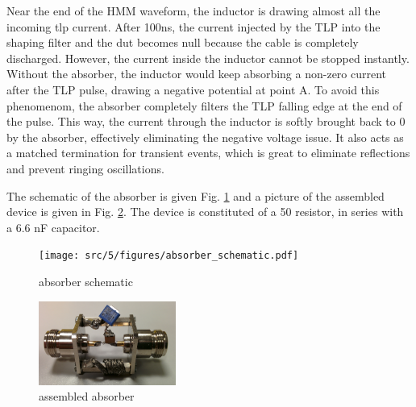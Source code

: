 Near the end of the HMM waveform, the inductor is drawing almost all the incoming \gls{tlp} current.
After 100ns, the current injected by the TLP into the shaping filter and the \gls{dut} becomes null because the cable is completely discharged.
However, the current inside the inductor cannot be stopped instantly.
Without the absorber, the inductor would keep absorbing a non-zero current after the TLP pulse, drawing a negative potential at point A.
To avoid this phenomenom, the absorber completely filters the TLP falling edge at the end of the pulse.
This way, the current through the inductor is softly brought back to 0 by the absorber, effectively eliminating the negative voltage issue.
It also acts as a matched termination for transient events, which is great to eliminate reflections and prevent ringing oscillations.

The schematic of the absorber is given Fig. \ref{fig:absorber_schematic} and a picture of the assembled device is given in Fig. \ref{pic:absorber_filter_assembled}.
The device is constituted of a 50\textOmega{} resistor, in series with a 6.6 nF capacitor.

\begin{figure}[!h]
  \centering
  \texttt{[image: src/5/figures/absorber\_schematic.pdf]}
  \caption{absorber schematic}
  \label{fig:absorber_schematic}
\end{figure}

\begin{figure}[!h]
  \centering
  \includegraphics[width=0.4\textwidth]{src/5/figures/absorber.jpg}
  \caption{assembled absorber}
  \label{pic:absorber_filter_assembled}
\end{figure}

